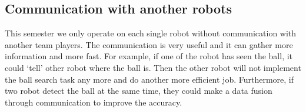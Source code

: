 \subsection{Communication with another robots}
This semester we only operate on each single robot without communication with another team players. The communication is very useful and it can gather more information and more fast. For example, if one of the robot has seen the ball, it could `tell' other robot where the ball is. Then the other robot will not implement the ball search task any more and do another more efficient job. Furthermore, if two robot detect the ball at the same time, they could make a data fusion through communication to improve the accuracy.

